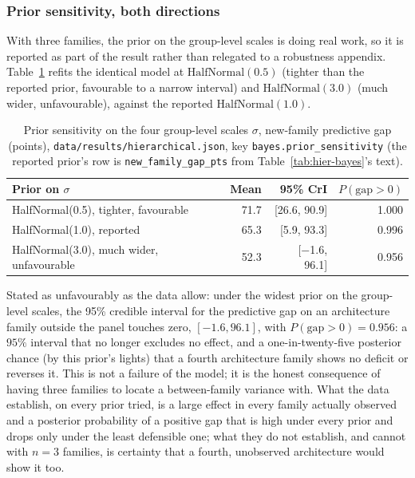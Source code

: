 \documentclass[11pt]{article}
\begin{document}
\subsubsection{Prior sensitivity, both directions}

With three families, the prior on the group-level scales is doing real work,
so it is reported as part of the result rather than relegated to a robustness
appendix. Table~\ref{tab:hier-prior} refits the identical model at
$\mathrm{HalfNormal}(0.5)$ (tighter than the reported prior, favourable to a
narrow interval) and $\mathrm{HalfNormal}(3.0)$ (much wider, unfavourable),
against the reported $\mathrm{HalfNormal}(1.0)$.

\begin{table}[h]
\centering
\caption{Prior sensitivity on the four group-level scales $\sigma$,
new-family predictive gap (points), \texttt{data/results/hierarchical.json},
key \texttt{bayes.prior\_sensitivity} (the reported prior's row is
\texttt{new\_family\_gap\_pts} from Table~\ref{tab:hier-bayes}'s text).}
\label{tab:hier-prior}
\small
\begin{tabular}{@{}lrrr@{}}
\toprule
Prior on $\sigma$ & Mean & 95\% CrI & $P(\mathrm{gap}>0)$ \\
\midrule
HalfNormal(0.5), tighter, favourable & 71.7 & [26.6, 90.9] & 1.000 \\
HalfNormal(1.0), reported & 65.3 & [5.9, 93.3] & 0.996 \\
HalfNormal(3.0), much wider, unfavourable & 52.3 & [$-$1.6, 96.1] & 0.956 \\
\bottomrule
\end{tabular}
\end{table}

Stated as unfavourably as the data allow: under the widest prior on the
group-level scales, the 95\% credible interval for the predictive gap on an
architecture family outside the panel touches zero, $[-1.6, 96.1]$, with
$P(\mathrm{gap}>0)=0.956$: a $95\%$ interval that no longer excludes no
effect, and a one-in-twenty-five posterior chance (by this prior's lights) that
a fourth architecture family shows no deficit or reverses it. This is not a
failure of the model; it is the honest consequence of having three families to
locate a between-family variance with. What the data establish, on every prior
tried, is a large effect in every family actually observed and a posterior
probability of a positive gap that is high under every prior and drops only
under the least defensible one; what they do not establish, and cannot with
$n=3$ families, is certainty that a fourth, unobserved architecture would show
it too.
\end{document}
